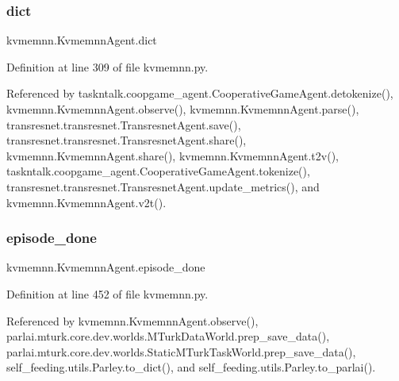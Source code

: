 \subsubsection{\texorpdfstring{dict}{dict}}
{\footnotesize\ttfamily kvmemnn.\+Kvmemnn\+Agent.\+dict}



Definition at line 309 of file kvmemnn.\+py.



Referenced by taskntalk.\+coopgame\+\_\+agent.\+Cooperative\+Game\+Agent.\+detokenize(), kvmemnn.\+Kvmemnn\+Agent.\+observe(), kvmemnn.\+Kvmemnn\+Agent.\+parse(), transresnet.\+transresnet.\+Transresnet\+Agent.\+save(), transresnet.\+transresnet.\+Transresnet\+Agent.\+share(), kvmemnn.\+Kvmemnn\+Agent.\+share(), kvmemnn.\+Kvmemnn\+Agent.\+t2v(), taskntalk.\+coopgame\+\_\+agent.\+Cooperative\+Game\+Agent.\+tokenize(), transresnet.\+transresnet.\+Transresnet\+Agent.\+update\+\_\+metrics(), and kvmemnn.\+Kvmemnn\+Agent.\+v2t().

\mbox{\label{classkvmemnn_1_1KvmemnnAgent_a0019d193f96811c4968694326b11e98e}} 
\subsubsection{\texorpdfstring{episode\+\_\+done}{episode\_done}}
{\footnotesize\ttfamily kvmemnn.\+Kvmemnn\+Agent.\+episode\+\_\+done}



Definition at line 452 of file kvmemnn.\+py.



Referenced by kvmemnn.\+Kvmemnn\+Agent.\+observe(), parlai.\+mturk.\+core.\+dev.\+worlds.\+M\+Turk\+Data\+World.\+prep\+\_\+save\+\_\+data(), parlai.\+mturk.\+core.\+dev.\+worlds.\+Static\+M\+Turk\+Task\+World.\+prep\+\_\+save\+\_\+data(), self\+\_\+feeding.\+utils.\+Parley.\+to\+\_\+dict(), and self\+\_\+feeding.\+utils.\+Parley.\+to\+\_\+parlai().

\mbox{\label{classkvmemnn_1_1KvmemnnAgent_a0d2db03a067bf5ec18a82946de160c34}} 

